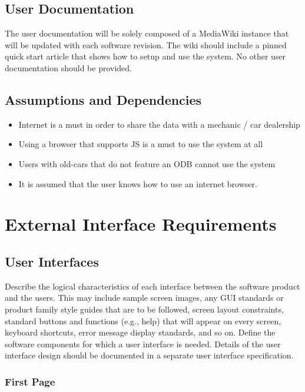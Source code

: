 \documentclass{scrreprt}
\begin{document}
\section{User Documentation}
The user documentation will be solely composed of a MediaWiki instance that will be updated with each software revision.
The wiki should include a pinned quick start article that shows how to setup and use the system.
No other user documentation should be provided.

\section{Assumptions and Dependencies}

\begin{itemize}
\item Internet is a must in order to share the data with a mechanic / car dealership
\item Using a browser that supports JS is a must to use the system at all
\item Users with old-cars that do not feature an ODB cannot use the system
\item It is assumed that the user knows how to use an internet browser.
\end{itemize}



\chapter{External Interface Requirements}

\section{User Interfaces}
Describe the logical characteristics of each interface between the software 
product and the users. This may include sample screen images, any GUI standards 
or product family style guides that are to be followed, screen layout 
constraints, standard buttons and functions (e.g., help) that will appear on 
every screen, keyboard shortcuts, error message display standards, and so on.  
Define the software components for which a user interface is needed. Details of 
the user interface design should be documented in a separate user interface 
specification.
\subsection{First Page}
\end{document}
